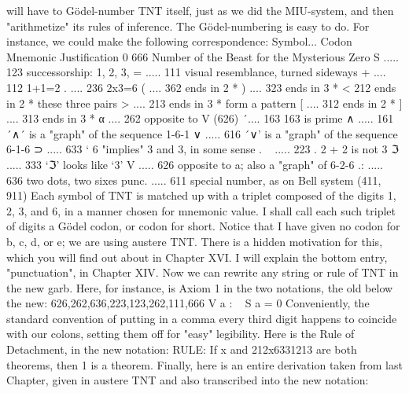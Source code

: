will have to Gödel-number TNT itself, just as we did the MIU-system, and then
"arithmetize" its rules of inference. The Gödel-numbering is easy to do. For instance, we
could make the following correspondence:
Symbol...         Codon         Mnemonic Justification
0                 666           Number of the Beast for the Mysterious Zero
S       .....     123           successorship: 1, 2, 3,
=       .....     111           visual resemblance, turned sideways
+       ....      112           1+1=2
.       ....      236           2x3=6
(       ....      362           ends in 2        *
)       ....      323           ends in 3        *
<                 212           ends in 2        * these three pairs
>       ....      213           ends in 3        * form a pattern
[       ....      312           ends in 2        *
]       ....      313           ends in 3        *
α       ....      262           opposite to V (626)
´....             163           163 is prime
∧       .....     161           ´∧´ is a "graph" of the sequence 1-6-1
∨       .....     616           ´∨' is a "graph" of the sequence 6-1-6
⊃       .....     633           ` 6 "implies" 3 and 3, in some sense .
~       .....     223           . 2 + 2 is not 3
ℑ       .....     333           `ℑ' looks like `3'
V       .....     626           opposite to a; also a "graph" of 6-2-6
.:      .....     636           two dots, two sixes
punc. .....       611           special number, as on Bell system (411, 911)
       Each symbol of TNT is matched up with a triplet composed of the digits 1, 2, 3,
and 6, in a manner chosen for mnemonic value. I shall call each such triplet of digits a
Gödel codon, or codon for short. Notice that I have given no codon for b, c, d, or e; we
are using austere TNT. There is a hidden motivation for this, which you will find out
about in Chapter XVI. I will explain the bottom entry, "punctuation", in Chapter XIV.
       Now we can rewrite any string or rule of TNT in the new garb. Here, for instance,
is Axiom 1 in the two notations, the old below the new:
                626,262,636,223,123,262,111,666
                 V a      : ~     S a = 0
Conveniently, the standard convention of putting in a comma every third digit happens to
coincide with our colons, setting them off for "easy" legibility.
        Here is the Rule of Detachment, in the new notation:
RULE: If x and 212x6331213 are both theorems, then 1 is a theorem. Finally, here is an
entire derivation taken from last Chapter, given in austere TNT and also transcribed into
the new notation:

